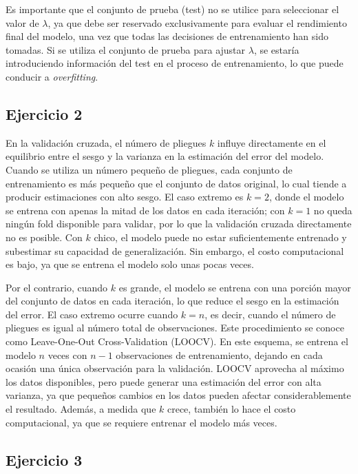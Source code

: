 \documentclass[12pt]{article}
\begin{document}
Es importante que el conjunto de prueba (test) no se utilice para seleccionar el valor de \(\lambda\), ya que debe ser reservado exclusivamente para evaluar el rendimiento final del modelo, una vez que todas las decisiones de entrenamiento han sido tomadas. Si se utiliza el conjunto de prueba para ajustar \(\lambda\), se estaría introduciendo información del test en el proceso de entrenamiento, lo que puede conducir a \textit{overfitting}.

\subsection*{Ejercicio 2}

En la validación cruzada, el número de pliegues \(k\) influye directamente en el equilibrio entre el sesgo y la varianza en la estimación del error del modelo. Cuando se utiliza un número pequeño de pliegues, cada conjunto de entrenamiento es más pequeño que el conjunto de datos original, lo cual tiende a producir estimaciones con alto sesgo. El caso extremo es \(k = 2\), donde el modelo se entrena con apenas la mitad de los datos en cada iteración; con \(k = 1\) no queda ningún fold disponible para validar, por lo que la validación cruzada directamente no es posible. Con \(k\) chico, el modelo puede no estar suficientemente entrenado y subestimar su capacidad de generalización. Sin embargo, el costo computacional es bajo, ya que se entrena el modelo solo unas pocas veces.

Por el contrario, cuando \(k\) es grande, el modelo se entrena con una porción mayor del conjunto de datos en cada iteración, lo que reduce el sesgo en la estimación del error. El caso extremo ocurre cuando \(k=n\), es decir, cuando el número de pliegues es igual al número total de observaciones. Este procedimiento se conoce como Leave-One-Out Cross-Validation (LOOCV). En este esquema, se entrena el modelo \(n\) veces con \(n - 1\) observaciones de entrenamiento, dejando en cada ocasión una única observación para la validación. LOOCV aprovecha al máximo los datos disponibles, pero puede generar una estimación del error con alta varianza, ya que pequeños cambios en los datos pueden afectar considerablemente el resultado. Además, a medida que \(k\) crece, también lo hace el costo computacional, ya que se requiere entrenar el modelo más veces.

\subsection*{Ejercicio 3}
\end{document}

